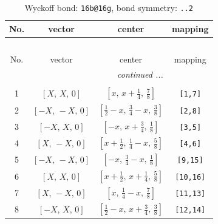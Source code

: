\documentclass[fleqn,8pt]{jsarticle}
\begin{document}
\begin{longtable}{cccc}
\caption{Wyckoff bond: {\tt 16b@16g}, bond symmetry: {\tt ..2}}
 \\
 \hline \hline
No. & vector & center & mapping \\ \hline \endfirsthead

\multicolumn{3}{l}{\tablename\ \thetable{}} \\
 \hline \hline
No. & vector & center & mapping \\ \hline \endhead

 \hline \hline
\multicolumn{3}{r}{\footnotesize\it continued ...} \\ \endfoot

 \hline \hline
\multicolumn{3}{r}{} \\ \endlastfoot

1 & $\left[ X,\, X,\, 0 \right]$ & $\left[ x,\, x + \frac{1}{4},\, \frac{7}{8} \right]$ & {\tt [1,7]} \\ \hline
2 & $\left[ - X,\, - X,\, 0 \right]$ & $\left[ \frac{1}{2} - x,\, \frac{3}{4} - x,\, \frac{3}{8} \right]$ & {\tt [2,8]} \\ \hline
3 & $\left[ - X,\, X,\, 0 \right]$ & $\left[ - x,\, x + \frac{3}{4},\, \frac{1}{8} \right]$ & {\tt [3,5]} \\ \hline
4 & $\left[ X,\, - X,\, 0 \right]$ & $\left[ x + \frac{1}{2},\, \frac{1}{4} - x,\, \frac{5}{8} \right]$ & {\tt [4,6]} \\ \hline
5 & $\left[ - X,\, - X,\, 0 \right]$ & $\left[ - x,\, \frac{3}{4} - x,\, \frac{1}{8} \right]$ & {\tt [9,15]} \\ \hline
6 & $\left[ X,\, X,\, 0 \right]$ & $\left[ x + \frac{1}{2},\, x + \frac{1}{4},\, \frac{5}{8} \right]$ & {\tt [10,16]} \\ \hline
7 & $\left[ X,\, - X,\, 0 \right]$ & $\left[ x,\, \frac{1}{4} - x,\, \frac{7}{8} \right]$ & {\tt [11,13]} \\ \hline
8 & $\left[ - X,\, X,\, 0 \right]$ & $\left[ \frac{1}{2} - x,\, x + \frac{3}{4},\, \frac{3}{8} \right]$ & {\tt [12,14]} \\
\end{longtable}
\renewcommand{\arraystretch}{1.2}
\end{document}
